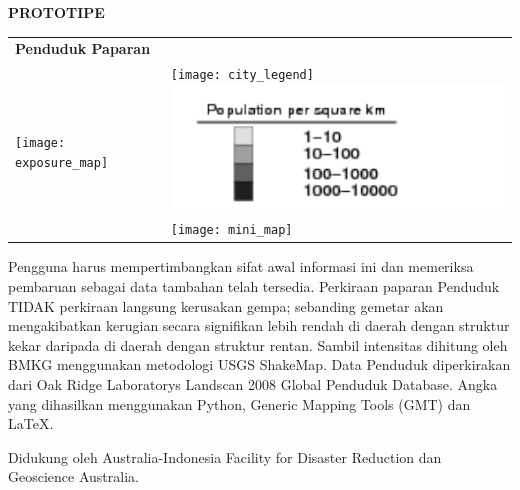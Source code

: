 \documentclass[a4paper]{article}
\begin{document}
\centerline{\Large \textbf{PROTOTIPE}}


\bigskip


\bigskip
\hspace{-6mm} 

\bigskip
\begin{tabular}{@{}l@{}l}
  \Large \textbf{Penduduk Paparan} & \\
  \parbox[t]{0.7\textwidth}{
    \vspace{0pt}
    \texttt{[image: exposure\_map]}} &
  \hspace{-10mm}
  \parbox[t]{0.3\textwidth}{
    \vspace{2mm}
    \texttt{[image: city\_legend]} \\
    \includegraphics{population_legend}\\
    \texttt{[image: mini\_map]}\\
  }
\end{tabular}

\bigskip
\bigskip
\bigskip

\parbox[t]{0.95\textwidth}{\scriptsize
Pengguna harus mempertimbangkan sifat awal informasi ini dan memeriksa pembaruan sebagai data tambahan telah tersedia. Perkiraan paparan Penduduk TIDAK perkiraan langsung kerusakan gempa; sebanding gemetar akan mengakibatkan kerugian secara signifikan lebih rendah di daerah dengan struktur kekar daripada di daerah dengan struktur rentan. Sambil intensitas dihitung oleh BMKG menggunakan metodologi USGS ShakeMap. Data Penduduk diperkirakan dari Oak Ridge Laboratorys Landscan 2008 Global Penduduk Database. Angka yang dihasilkan menggunakan Python, Generic Mapping Tools (GMT) dan \LaTeX.

Didukung oleh Australia-Indonesia Facility for Disaster Reduction dan Geoscience Australia.}
\end{document}
